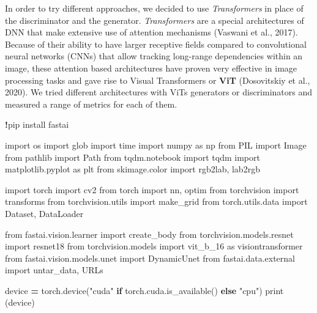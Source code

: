 \documentclass[
]{article}
\newenvironment{Shaded}{\begin{snugshade}}{\end{snugshade}}
\newcommand{\BuiltInTok}[1]{#1}
\newcommand{\ControlFlowTok}[1]{\textcolor[rgb]{0.13,0.29,0.53}{\textbf{#1}}}
\newcommand{\ImportTok}[1]{#1}
\newcommand{\NormalTok}[1]{#1}
\newcommand{\OperatorTok}[1]{\textcolor[rgb]{0.81,0.36,0.00}{\textbf{#1}}}
\newcommand{\StringTok}[1]{\textcolor[rgb]{0.31,0.60,0.02}{#1}}
\begin{document}
In order to try different approaches, we decided to use
\emph{Transformers} in place of the discriminator and the generator.
\emph{Transformers} are a special architectures of DNN that make
extensive use of attention mechanisms (Vaswani et al., 2017). Because of
their ability to have larger receptive fields compared to convolutional
neural networks (CNNs) that allow tracking long-range dependencies
within an image, these attention based architectures have proven very
effective in image processing tasks and gave rise to Visual Transformers
or \textbf{ViT} (Dosovitskiy et al., 2020). We tried different
architectures with ViTs generators or discriminators and measured a
range of metrics for each of them.

\begin{Shaded}
\begin{Highlighting}[]
\OperatorTok{!}\NormalTok{pip install fastai }
\end{Highlighting}
\end{Shaded}

\begin{Shaded}
\begin{Highlighting}[]
\ImportTok{import}\NormalTok{ os}
\ImportTok{import}\NormalTok{ glob}
\ImportTok{import}\NormalTok{ time}
\ImportTok{import}\NormalTok{ numpy }\ImportTok{as}\NormalTok{ np}
\ImportTok{from}\NormalTok{ PIL }\ImportTok{import}\NormalTok{ Image}
\ImportTok{from}\NormalTok{ pathlib }\ImportTok{import}\NormalTok{ Path}
\ImportTok{from}\NormalTok{ tqdm.notebook }\ImportTok{import}\NormalTok{ tqdm}
\ImportTok{import}\NormalTok{ matplotlib.pyplot }\ImportTok{as}\NormalTok{ plt}
\ImportTok{from}\NormalTok{ skimage.color }\ImportTok{import}\NormalTok{ rgb2lab, lab2rgb}

\ImportTok{import}\NormalTok{ torch}
\ImportTok{import}\NormalTok{ cv2}
\ImportTok{from}\NormalTok{ torch }\ImportTok{import}\NormalTok{ nn, optim}
\ImportTok{from}\NormalTok{ torchvision }\ImportTok{import}\NormalTok{ transforms}
\ImportTok{from}\NormalTok{ torchvision.utils }\ImportTok{import}\NormalTok{ make\_grid}
\ImportTok{from}\NormalTok{ torch.utils.data }\ImportTok{import}\NormalTok{ Dataset, DataLoader}

\ImportTok{from}\NormalTok{ fastai.vision.learner }\ImportTok{import}\NormalTok{ create\_body}
\ImportTok{from}\NormalTok{ torchvision.models.resnet }\ImportTok{import}\NormalTok{ resnet18}
\ImportTok{from}\NormalTok{ torchvision.models }\ImportTok{import}\NormalTok{ vit\_b\_16 }\ImportTok{as}\NormalTok{ visiontransformer}
\ImportTok{from}\NormalTok{ fastai.vision.models.unet }\ImportTok{import}\NormalTok{ DynamicUnet}
\ImportTok{from}\NormalTok{ fastai.data.external }\ImportTok{import}\NormalTok{ untar\_data, URLs}

\NormalTok{device }\OperatorTok{=}\NormalTok{ torch.device(}\StringTok{"cuda"} \ControlFlowTok{if}\NormalTok{ torch.cuda.is\_available() }\ControlFlowTok{else} \StringTok{"cpu"}\NormalTok{)}
\BuiltInTok{print}\NormalTok{ (device)}
\end{Highlighting}
\end{Shaded}
\end{document}

